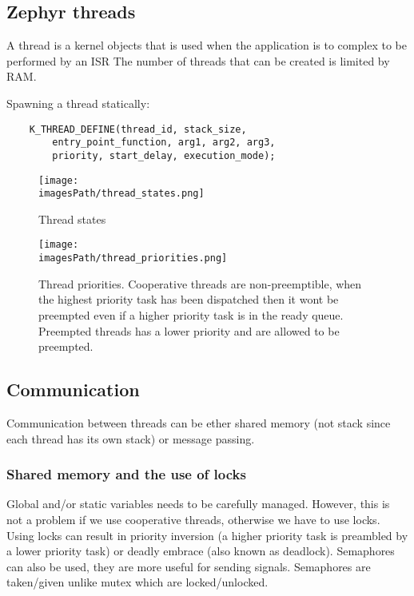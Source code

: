 \subsection{Zephyr threads}
A thread is a kernel objects that is used when the application is to 
complex to be performed by an ISR
The number of threads that can be created is limited by RAM.

Spawning a thread statically:
\begin{verbatim}
    K_THREAD_DEFINE(thread_id, stack_size, 
        entry_point_function, arg1, arg2, arg3,
        priority, start_delay, execution_mode);
\end{verbatim}

\begin{figure}[H]
    \centering
    \texttt{[image: \\imagesPath/thread\_states.png]}
    \caption{Thread states}
    \label{fig:thread_states}
\end{figure}

\begin{figure}[H]
    \centering
    \texttt{[image: \\imagesPath/thread\_priorities.png]}
    \caption{Thread priorities. Cooperative threads are non-preemptible, 
    when the highest priority task has been dispatched then it wont be preempted 
    even if a higher priority task is in the ready queue. Preempted threads 
    has a lower priority and are allowed to be preempted.}
    \label{fig:thread_priorities}
\end{figure}


\subsection{Communication}
Communication between threads can be ether shared memory (not stack since each thread has its own stack)
or message passing. 

\subsubsection{Shared memory and the use of locks}
Global and/or static variables needs to be carefully managed.
However, this is not a problem if we use cooperative threads, otherwise we have to use locks. 
Using locks can result in priority inversion (a higher priority task is preambled by a lower priority task) 
or deadly embrace (also known as deadlock).
Semaphores can also be used, they are more useful for sending signals.
Semaphores are taken/given unlike mutex which are locked/unlocked.

